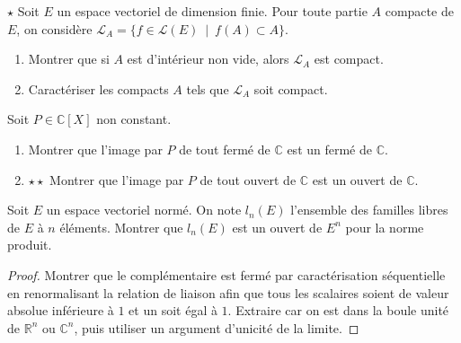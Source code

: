 \documentclass[french,a4paper]{article}
\newcommand{\R}{\mathbb{R}}
\newcommand{\C}{\mathbb{C}}
\theoremstyle{plain}
\theoremstyle{definition}
\theoremstyle{remark}
\begin{document}
\begin{ex}{$\star$}
	Soit $E$ un espace vectoriel de dimension finie. Pour toute partie $A$ compacte de $E$, on considère $\mathcal{L}_A=\{f\in\mathcal{L}(E)\ \mid\ f(A)\subset A\}$.
	\begin{enumerate}
		\item Montrer que si $A$ est d'intérieur non vide, alors $\mathcal{L}_A$ est compact.
		\item Caractériser les compacts $A$ tels que $\mathcal{L}_A$ soit compact.
	\end{enumerate}
\end{ex}

\begin{ex}{}
	Soit $P\in\C[X]$ non constant.
	\begin{enumerate}
		\item Montrer que l'image par $P$ de tout fermé de $\C$ est un fermé de $\C$.
		\item $\star\star$ Montrer que l'image par $P$ de tout ouvert de $\C$ est un ouvert de $\C$.
	\end{enumerate}
\end{ex}

\begin{ex}{}
	Soit $E$ un espace vectoriel normé. On note $l_n(E)$ l'ensemble des familles libres de $E$ à $n$ éléments. Montrer que $l_n(E)$ est un ouvert de $E^n$ pour la norme produit.
\end{ex}
\begin{proof}
	Montrer que le complémentaire est fermé par caractérisation séquentielle en renormalisant la relation de liaison afin que tous les scalaires soient de valeur absolue inférieure à $1$ et un soit égal à $1$. Extraire car on est dans la boule unité de $\R^n$ ou $\C^n$, puis utiliser un argument d'unicité de la limite.
\end{proof}
\end{document}
